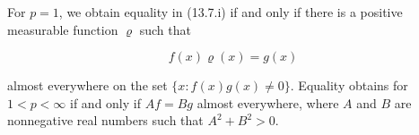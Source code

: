For $p = 1$, we obtain equality in (13.7.i) if and only if there is a positive measurable function $\varrho$ such that

$$f(x) \varrho(x) = g(x)$$

almost everywhere on the set $\{x : f(x) g(x) \neq 0\}$. Equality obtains for $1 < p < \infty$ if and only if $Af = Bg$ almost everywhere, where $A$ and $B$ are nonnegative real numbers such that $A^2 + B^2 > 0$.